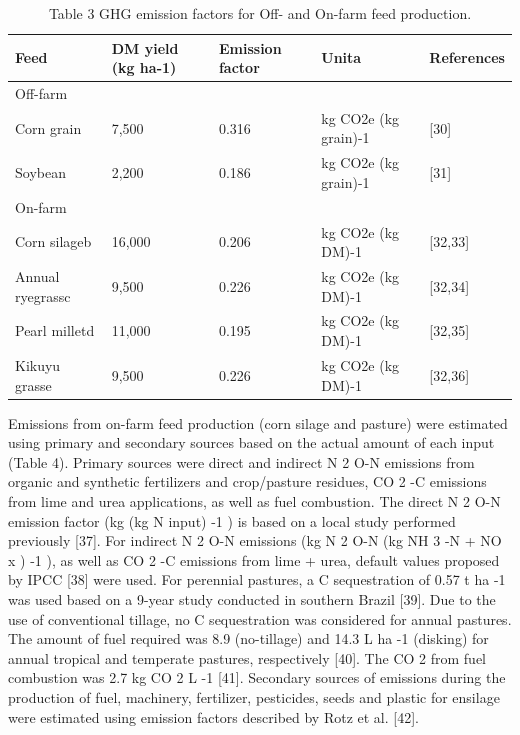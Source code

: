 \documentclass[11pt,a4paper]{article}
\begin{document}
\begin{table}[h]
\caption{Table 3 GHG emission factors for Off- and On-farm feed production.}
\begin{tabular}{|l|l|l|l|l|}
\hline
Feed & DM yield (kg ha-1) & Emission factor & Unita & References \\ \hline
Off-farm &  &  &  &  \\ \hline
Corn grain & 7,500 & 0.316 & kg CO2e (kg grain)-1 & [30] \\ \hline
Soybean & 2,200 & 0.186 & kg CO2e (kg grain)-1 & [31] \\ \hline
On-farm &  &  &  &  \\ \hline
Corn silageb & 16,000 & 0.206 & kg CO2e (kg DM)-1 & [32,33] \\ \hline
Annual ryegrassc & 9,500 & 0.226 & kg CO2e (kg DM)-1 & [32,34] \\ \hline
Pearl milletd & 11,000 & 0.195 & kg CO2e (kg DM)-1 & [32,35] \\ \hline
Kikuyu grasse & 9,500 & 0.226 & kg CO2e (kg DM)-1 & [32,36] \\ \hline
\end{tabular}
\end{table}

Emissions from on-farm feed production (corn silage and pasture) were estimated using primary and secondary sources based on the actual amount of each input (Table 4). Primary sources were direct and indirect N 2 O-N emissions from organic and synthetic fertilizers and crop/pasture residues, CO 2 -C emissions from lime and urea applications, as well as fuel combustion. The direct N 2 O-N emission factor (kg (kg N input) -1 ) is based on a local study performed previously [37]. For indirect N 2 O-N emissions (kg N 2 O-N (kg NH 3 -N + NO x ) -1 ), as well as CO 2 -C emissions from lime + urea, default values proposed by IPCC [38] were used. For perennial pastures, a C sequestration of 0.57 t ha -1 was used based on a 9-year study conducted in southern Brazil [39]. Due to the use of conventional tillage, no C sequestration was considered for annual pastures. The amount of fuel required was 8.9 (no-tillage) and 14.3 L ha -1 (disking) for annual tropical and temperate pastures, respectively [40]. The CO 2 from fuel combustion was 2.7 kg CO 2 L -1 [41]. Secondary sources of emissions during the production of fuel, machinery, fertilizer, pesticides, seeds and plastic for ensilage were estimated using emission factors described by Rotz et al. [42].
\end{document}
